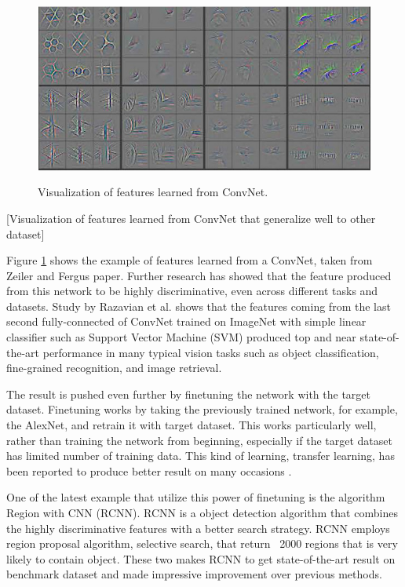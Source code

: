 \documentclass[a4paper,11pt]{kth-mag}
\begin{document}
\begin{figure}[h]
\centering
\includegraphics[scale=0.3]{image/cnn.png}
\label{fig:cnn}
\caption{Visualization of features learned from ConvNet.}
\end{figure}
[Visualization of features learned from ConvNet that generalize well to other dataset]

Figure \ref{fig:cnn} shows the example of features learned from a ConvNet, taken from Zeiler and Fergus \cite{zeiler2014} paper. Further research has showed that the feature produced from this network to be highly discriminative, even across different tasks and datasets. Study by Razavian et al. \cite{razavian2014} shows that the features coming from the last second fully-connected of ConvNet trained on ImageNet with simple linear classifier such as Support Vector Machine (SVM) produced top and near state-of-the-art performance in many typical vision tasks such as object classification, fine-grained recognition, and image retrieval. 

The result is pushed even further by finetuning the network with the target dataset. Finetuning works by taking the previously trained network, for example, the AlexNet, and retrain it with target dataset. This works particularly well, rather than training the network from beginning, especially if the target dataset has limited number of training data. This kind of learning, transfer learning, has been reported to produce better result on many occasions \cite{azizpour2014}.

One of the latest example that utilize this power of finetuning is the algorithm Region with CNN (RCNN). RCNN is a object detection algorithm that combines the highly discriminative features with a better search strategy. RCNN employs region proposal algorithm, selective search, that return ~2000 regions that is very likely to contain object. These two makes RCNN to get state-of-the-art result on benchmark dataset and made impressive improvement over previous methods.
\end{document}
